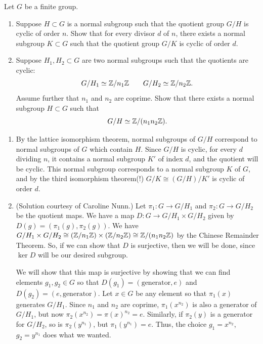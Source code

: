 %
\begin{question}[subtitle=August 2025 Problem 3,ID=Aug25_3]
Let $G$ be a finite group.
\begin{enumerate}
    \item Suppose $H \subset G$ is a normal subgroup such that the quotient group $G/H$ is cyclic of order $n$. Show that for every divisor $d$ of $n$, there exists a normal subgroup $K \subset G$ such that the quotient group $G/K$ is cyclic of order $d$.
    \item Suppose $H_1, H_2 \subset G$ are two normal subgroups such that the quotients are cyclic:
    \[G/H_1 \simeq \mathbb{Z}/n_1\mathbb{Z} \qquad G/H_2 \simeq \mathbb{Z}/n_2\mathbb{Z}.\]
    Assume further that $n_1$ and $n_2$ are coprime. Show that there exists a normal subgroup $H \subset G$ such that
    \[G/H \simeq \mathbb{Z}/(n_1 n_2 \mathbb{Z}).\]
\end{enumerate}
\end{question}
\begin{solution}
\begin{enumerate}
    \item By the lattice isomorphism theorem, normal subgroups of $G/H$ correspond to normal subgroups of $G$ which contain $H$. Since $G/H$ is cyclic, for every $d$ dividing $n$, it contains a normal subgroup $K'$ of index $d$, and the quotient will be cyclic. This normal subgroup corresponds to a normal subgroup $K$ of $G$, and by the third isomorphism theorem(!) $G/K \cong (G/H)/K'$ is cyclic of order $d$.
    \item (Solution courtesy of Caroline Nunn.) Let $\pi_1\colon G \to G/H_1$ and $\pi_2\colon G \to G/H_2$ be the quotient maps. We have a map $D\colon G \to G/H_1 \times G/H_2$ given by $D(g) = (\pi_1(g),\pi_2(g))$. We have $G/H_1 \times G/H_2 \cong (\mathbb{Z}/n_1\mathbb{Z}) \times (\mathbb{Z}/n_2\mathbb{Z}) \cong \mathbb{Z}/(n_1n_2 \mathbb{Z})$ by the Chinese Remainder Theorem. So, if we can show that $D$ is surjective, then we will be done, since $\ker D$ will be our desired subgroup.
    
    We will show that this map is surjective by showing that we can find elements $g_1,g_2 \in G$ so that $D(g_1) = (\mathrm{generator},e)$ and $D(g_2) = (e,\mathrm{generator})$. Let $x \in G$ be any element so that $\pi_1(x)$ generates $G/H_1$. Since $n_1$ and $n_2$ are coprime, $\pi_1(x^{n_2})$ is also a generator of $G/H_1$, but now $\pi_2(x^{n_2}) = \pi(x)^{n_2} = e$. Similarly, if $\pi_2(y)$ is a generator for $G/H_2$, so is $\pi_2(y^{n_1})$, but $\pi_1(y^{n_1}) = e$. Thus, the choice $g_1 = x^{n_2}$, $g_2 = y^{n_1}$ does what we wanted.
\end{enumerate}
\end{solution}

